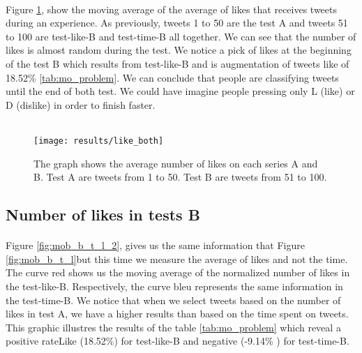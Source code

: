 \paragraph{}
Figure \ref{fig:like_both}, show the moving average of the average of likes that receives tweets during an experience. As previously, tweets 1 to 50 are the test A and tweets 51 to 100 are test-like-B and test-time-B all together. We can see that the number of likes is almost random during the test. We notice a pick of likes at the beginning of the test B which results from test-like-B and is augmentation of tweets like of 18.52\% \ref{tab:mo_problem}. We can conclude that people are classifying tweets until the end of both test. We could have imagine people pressing only L (like) or D (dislike) in order to finish faster. \\ \\

\begin{figure}[h] 
\centering 
\texttt{[image: results/like\_both]} 
\caption[Average like on the 100 tweets]{The graph shows the average number of likes on each series A and B. Test A are tweets from 1 to 50. Test B are tweets from 51 to 100.}
\label{fig:like_both} 
\end{figure}

\subsection{Number of likes in tests B}

\paragraph{}
Figure \ref{fig:mob_b_t_l_2}, gives us the same information that Figure \ref{fig:mob_b_t_l}but this time we measure the average of likes and not the time. The curve red shows us the moving average of the normalized number of likes in the test-like-B. Respectively, the curve bleu represents the same information in the test-time-B. We notice that when we select tweets based on the number of likes in test A, we have a higher results than based on the time spent on tweets. This graphic illustres the results of the table \ref{tab:mo_problem} which reveal a positive rateLike (18.52\%) for test-like-B and negative (-9.14\% ) for test-time-B. \\\\\\\\\\\\\\\\


